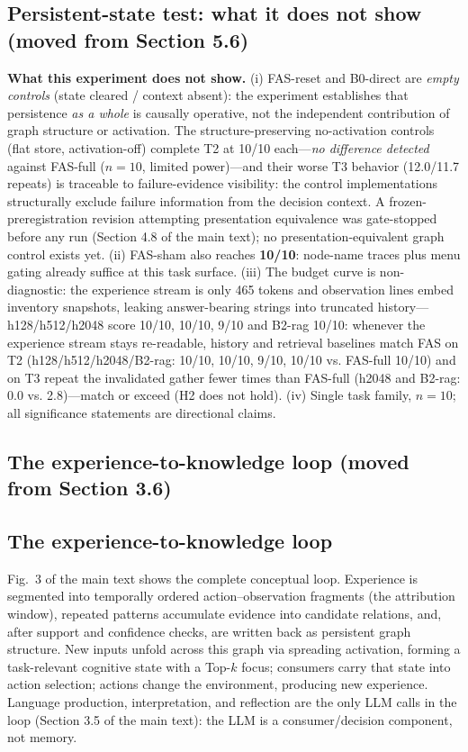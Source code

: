 \documentclass[10pt]{article}
\begin{document}
\subsection{Persistent-state test: what it does not show (moved from Section 5.6)}
\textbf{What this experiment does not show.} (i) FAS-reset and
B0-direct are \emph{empty controls} (state cleared / context absent):
the experiment establishes that persistence \emph{as a whole} is
causally operative, not the independent contribution of graph
structure or activation. The structure-preserving no-activation
controls (flat store, activation-off) complete T2 at 10/10
each---\emph{no difference detected} against FAS-full ($n{=}10$,
limited power)---and their worse T3 behavior (12.0/11.7 repeats) is
traceable to failure-evidence visibility: the control implementations
structurally exclude failure information from the decision context.
A frozen-preregistration revision attempting presentation equivalence
was gate-stopped before any run (Section 4.8 of the main text); no
presentation-equivalent graph control exists yet. (ii) FAS-sham also reaches
\textbf{10/10}: node-name traces plus menu gating already suffice at
this task surface. (iii) The budget curve is non-diagnostic: the
experience stream is only 465 tokens and observation lines embed
inventory snapshots, leaking answer-bearing strings into truncated
history---h128/h512/h2048 score 10/10, 10/10, 9/10 and B2-rag 10/10:
whenever the experience stream stays re-readable, history and retrieval baselines match FAS on T2 (h128/h512/h2048/B2-rag: 10/10, 10/10, 9/10, 10/10 vs. FAS-full 10/10) and on T3 repeat the invalidated gather fewer times than FAS-full (h2048 and B2-rag: 0.0 vs. 2.8)---match or exceed (H2 does not hold). (iv) Single task
family, $n{=}10$; all significance statements are directional claims.




\subsection{The experience-to-knowledge loop (moved from Section 3.6)}
\subsection{The experience-to-knowledge loop}
\label{sec:arch-loop}
Fig.~3 of the main text shows the complete conceptual loop. Experience is segmented into temporally ordered action--observation fragments (the attribution window), repeated patterns accumulate evidence into candidate relations, and, after support and confidence checks, are written back as persistent graph structure. New inputs unfold across this graph via spreading activation, forming a task-relevant cognitive state with a Top-$k$ focus; consumers carry that state into action selection; actions change the environment, producing new experience. Language production, interpretation, and reflection are the only LLM calls in the loop (Section 3.5 of the main text): the LLM is a consumer/decision component, not memory.
\end{document}
